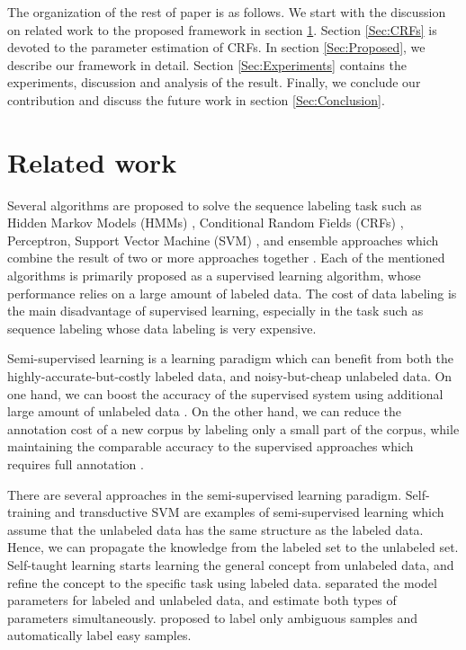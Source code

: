 \documentclass[english]{jnlp_JS2.0}
\begin{document}
The organization of the rest of paper is as follows. We start with the discussion on related work to the proposed framework in section \ref{Sec:RelatedWork}. Section \ref{Sec:CRFs} is devoted to the parameter estimation of CRFs. In section \ref{Sec:Proposed}, we describe our framework in detail. Section \ref{Sec:Experiments} contains the experiments, discussion and analysis of the result. Finally, we conclude our contribution and discuss the future work in section \ref{Sec:Conclusion}.



\section{Related work}
\label{Sec:RelatedWork}

Several algorithms are proposed to solve the sequence labeling task such as Hidden Markov Models (HMMs) \cite{Rabiner89}, Conditional Random Fields (CRFs) \cite{LaffertyCRF}, Perceptron, Support Vector Machine (SVM) \cite{Kudo2001}, and ensemble approaches which combine the result of two or more approaches together \cite{Nguyen2007}. Each of the mentioned algorithms is primarily proposed as a supervised learning algorithm, whose performance relies on a large amount of labeled data. The cost of data labeling is the main disadvantage of supervised learning, especially in the task such as sequence labeling whose data labeling is very expensive.

Semi-supervised learning is a learning paradigm which can benefit from both the highly-accurate-but-costly labeled data, and noisy-but-cheap unlabeled data. On one hand, we can boost the accuracy of the supervised system using additional large amount of unlabeled data \cite{Ando2005,Suzuki2008}. On the other hand, we can reduce the annotation cost of a new corpus by labeling only a small part of the corpus, while maintaining the comparable accuracy to the supervised approaches which requires full annotation \cite{Culotta2005}.

There are several approaches in the semi-supervised learning paradigm. Self-training and transductive SVM \cite{TransductiveSVM} are examples of semi-supervised learning which assume that the unlabeled data has the same structure as the labeled data. Hence, we can propagate the knowledge from the labeled set to the unlabeled set. Self-taught learning \cite{Raina2007} starts learning the general concept from unlabeled data, and refine the concept to the specific task using labeled data. \cite{Suzuki2008} separated the model parameters for labeled and unlabeled data, and estimate both types of parameters simultaneously. \cite{Dasgupta2009} proposed to label only ambiguous samples and automatically label easy samples. 
\end{document}
